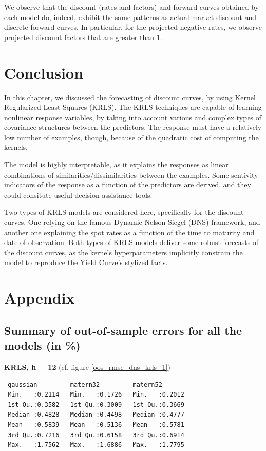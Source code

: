 We observe that the discount (rates and factors) and forward curves obtained by each model do, indeed, exhibit the same patterns as actual market discount and discrete forward curves. In particular, for the projected negative rates, we observe projected discount factors that are greater than $1$. 

\newpage

\section{Conclusion}

In this chapter, we discussed the forecasting of discount curves, by using Kernel Regularized Least Squares (KRLS). The KRLS techniques are capable of learning nonlinear response variables, by taking into account various and complex types of covariance structures between the predictors. The response must have a relatively low number of examples, though, because of the quadratic cost of computing the kernels. 

The model is highly interpretable, as it explains the responses as linear combinations of similarities/dissimilarities between the examples. Some sentivity indicators of the response as a function of the predictors are derived, and they could consitute useful decision-assistance tools. 

Two types of KRLS models are considered here, specifically for the discount curves. One relying on the famous Dynamic Nelson-Siegel (DNS) framework, and another one explaining the spot rates as a function of the time to maturity and date of observation. Both types of KRLS models deliver some robust forecasts of the discount curves, as the kernels hyperparameters implicitly constrain the model to reproduce the Yield Curve's stylized facts. 

\newpage

\section{Appendix}

\subsection{Summary of out-of-sample errors for all the models (in \%)}
\label{appendix_oos_rmse}

\textbf{KRLS, h = 12} (cf. figure \ref{oos_rmse_dns_krls_1})

\begin{verbatim}
 gaussian         matern32         matern52     
 Min.   :0.2114   Min.   :0.1726   Min.   :0.2012  
 1st Qu.:0.3582   1st Qu.:0.3009   1st Qu.:0.3669  
 Median :0.4828   Median :0.4498   Median :0.4777  
 Mean   :0.5839   Mean   :0.5136   Mean   :0.5781  
 3rd Qu.:0.7216   3rd Qu.:0.6158   3rd Qu.:0.6914  
 Max.   :1.7562   Max.   :1.6886   Max.   :1.7795  
\end{verbatim}

